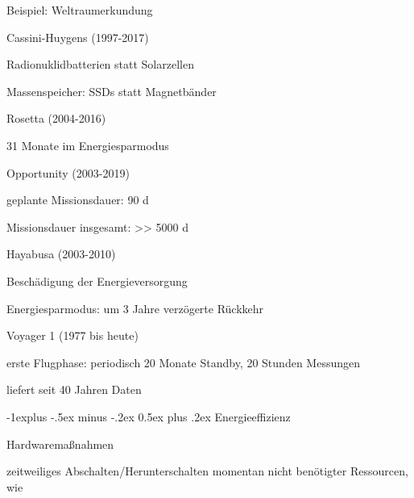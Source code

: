 \documentclass[a4paper]{article}
\makeatletter
\renewcommand{\subsection}{\@startsection{subsection}{2}{0mm}%
 {-1explus -.5ex minus -.2ex}%
 {0.5ex plus .2ex}%
 {\normalfont\normalsize\bfseries}}
\makeatother
\begin{document}
\begin{multicols}{3}
    Beispiel: Weltraumerkundung

    \begin{itemize*}
        \item
        Cassini-Huygens (1997-2017)
        \begin{itemize*}
            \item Radionuklidbatterien statt Solarzellen
            \item Massenspeicher: SSDs statt Magnetbänder
        \end{itemize*}
        \item
        Rosetta (2004-2016)
        \begin{itemize*}
            \item 31 Monate im Energiesparmodus
        \end{itemize*}
        \item
        Opportunity (2003-2019)
        \begin{itemize*}
            \item geplante Missionsdauer: 90 d
            \item Missionsdauer insgesamt: \textgreater\textgreater{} 5000 d
        \end{itemize*}
        \item
        Hayabusa (2003-2010)
        \begin{itemize*}
            \item Beschädigung der Energieversorgung
            \item Energiesparmodus: um 3 Jahre verzögerte Rückkehr
        \end{itemize*}
        \item
        Voyager 1 (1977 bis heute)
        \begin{itemize*}
            \item erste Flugphase: periodisch 20 Monate Standby, 20 Stunden Messungen
            \item liefert seit 40 Jahren Daten
        \end{itemize*}
    \end{itemize*}


    \subsection{Energieeffizienz}

    Hardwaremaßnahmen

    \begin{itemize*}
        \item
        zeitweiliges Abschalten/Herunterschalten momentan nicht benötigter
        Ressourcen, wie
    \end{itemize*}


\end{multicols}
\end{document}
